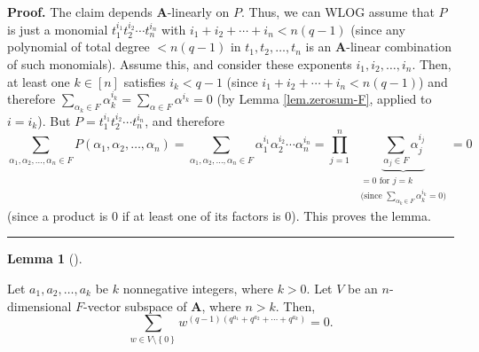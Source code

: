 \documentclass[numbers=enddot,12pt,final,onecolumn,notitlepage]{scrartcl}%
\numberwithin{exer}{section}
\theoremstyle{definition}
\newtheorem{lem}[theo]{Lemma}
\newenvironment{lemma}[1][]
{\begin{lem}[#1]\begin{leftbar}}
{\end{leftbar}\end{lem}}
\newenvironment{proof}[1][Proof]{\noindent\textbf{#1.} }{\ \rule{0.5em}{0.5em}}
\let\sumnonlimits\sum
\let\prodnonlimits\prod
\renewcommand{\sum}{\sumnonlimits\limits}
\renewcommand{\prod}{\prodnonlimits\limits}
\theoremstyle{plainsl}
\begin{document}
\begin{proof}
The claim depends $\mathbf{A}$-linearly on $P$. Thus, we can WLOG assume that
$P$ is just a monomial $t_{1}^{i_{1}}t_{2}^{i_{2}}\cdots t_{n}^{i_{n}}$ with
$i_{1}+i_{2}+\cdots+i_{n}<n\left(  q-1\right)  $ (since any polynomial of
total degree $<n\left(  q-1\right)  $ in $t_{1},t_{2},\ldots,t_{n}$ is an
$\mathbf{A}$-linear combination of such monomials). Assume this, and consider
these exponents $i_{1},i_{2},\ldots,i_{n}$. Then, at least one $k\in\left[
n\right]  $ satisfies $i_{k}<q-1$ (since $i_{1}+i_{2}+\cdots+i_{n}<n\left(
q-1\right)  $) and therefore $\sum_{\alpha_{k}\in F}\alpha_{k}^{i_{k}}%
=\sum_{\alpha\in F}\alpha^{i_{k}}=0$ (by Lemma \ref{lem.zerosum-F}, applied to
$i=i_{k}$). But $P=t_{1}^{i_{1}}t_{2}^{i_{2}}\cdots t_{n}^{i_{n}}$, and
therefore%
\[
\sum_{\alpha_{1},\alpha_{2},\ldots,\alpha_{n}\in F}P\left(  \alpha_{1}%
,\alpha_{2},\ldots,\alpha_{n}\right)  =\sum_{\alpha_{1},\alpha_{2}%
,\ldots,\alpha_{n}\in F}\alpha_{1}^{i_{1}}\alpha_{2}^{i_{2}}\cdots\alpha
_{n}^{i_{n}}=\prod_{j=1}^{n}\ \ \underbrace{\sum_{\alpha_{j}\in F}\alpha
_{j}^{i_{j}}}_{\substack{=0\text{ for }j=k\\\text{(since }\sum_{\alpha_{k}\in
F}\alpha_{k}^{i_{k}}=0\text{)}}}=0
\]
(since a product is $0$ if at least one of its factors is $0$). This proves
the lemma.
\end{proof}

\begin{lemma}
\label{lem.zerosum}Let $a_{1},a_{2},\ldots,a_{k}$ be $k$ nonnegative integers,
where $k>0$. Let $V$ be an $n$-dimensional $F$-vector subspace of $\mathbf{A}%
$, where $n>k$. Then,%
\[
\sum_{w\in V\setminus\left\{  0\right\}  }w^{\left(  q-1\right)  \left(
q^{a_{1}}+q^{a_{2}}+\cdots+q^{a_{k}}\right)  }=0.
\]

\end{lemma}
\end{document}
